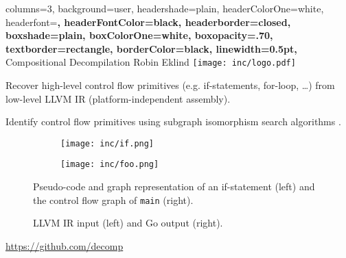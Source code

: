 \documentclass[a2paper,landscape,fontscale=0.35]{baposter}
\begin{document}
\begin{poster}{
	columns=3,
	background=user,
	headershade=plain,
	headerColorOne=white,
	headerfont=\Large\bfseries,
	headerFontColor=black,
	headerborder=closed,
	boxshade=plain,
	boxColorOne=white,
	boxopacity=.70,
	textborder=rectangle,
	borderColor=black,
	linewidth=0.5pt,
}
{}
{Compositional Decompilation}
{Robin Eklind}
{\texttt{[image: inc/logo.pdf]}}

{
	Recover high-level control flow primitives (e.g. if-statements, for-loop, …) from low-level LLVM IR (platform-independent assembly).
}

{
	Identify control flow primitives using subgraph isomorphism search algorithms \cite{decomp_llvm}.

	\setlength{\intextsep}{5pt}
	\setlength{\abovecaptionskip}{5pt}

	\begin{figure}[H]
		\centering
		\begin{subfigure}[ht]{0.30\textwidth}
			
			\texttt{[image: inc/if.png]}
		\end{subfigure}
		\enskip
		\begin{subfigure}[ht]{0.50\textwidth}
			\texttt{[image: inc/foo.png]}
		\end{subfigure}
		\caption{Pseudo-code and graph representation of an if-statement (left) and the control flow graph of \texttt{main} (right).}
	\end{figure}
}

{
	\setlength{\intextsep}{0pt}
	\setlength{\abovecaptionskip}{0pt}

	\begin{figure}[H]
		\centering
		\begin{subfigure}[ht]{0.58\textwidth}
			
		\end{subfigure}
		\enskip
		\begin{subfigure}[ht]{0.38\textwidth}
			
		\end{subfigure}
		\caption{LLVM IR input (left) and Go output (right).}
	\end{figure}
}

{
	\url{https://github.com/decomp}
}

{
	\renewcommand{\section}[2]{}
	
}

\end{poster}
\end{document}
